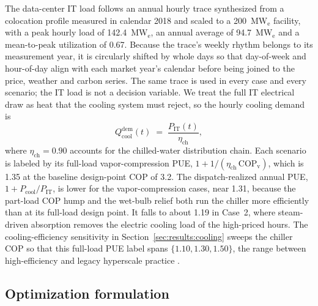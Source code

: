 \documentclass[sn-vancouver,Numbered]{sn-jnl}%
\begin{document}
The data-center IT load follows an annual hourly trace synthesized from a colocation profile measured in calendar 2018 and scaled to a 200~MW$_\mathrm{e}$ facility, with a peak hourly load of 142.4~MW$_\mathrm{e}$, an annual average of 94.7~MW$_\mathrm{e}$ and a mean-to-peak utilization of 0.67. Because the trace's weekly rhythm belongs to its measurement year, it is circularly shifted by whole days so that day-of-week and hour-of-day align with each market year's calendar before being joined to the price, weather and carbon series. The same trace is used in every case and every scenario; the IT load is not a decision variable. We treat the full IT electrical draw as heat that the cooling system must reject, so the hourly cooling demand is
\begin{equation}
\label{eq:cool_demand}
Q_{\mathrm{cool}}^{\mathrm{dem}}(t) \;=\; \frac{P_{\mathrm{IT}}(t)}{\eta_{\mathrm{ch}}},
\end{equation}
where $\eta_{\mathrm{ch}}=0.90$ accounts for the chilled-water distribution chain. Each scenario is labeled by its full-load vapor-compression PUE, $1+1/(\eta_{\mathrm{ch}}\,\mathrm{COP}_{\mathrm{v}})$, which is 1.35 at the baseline design-point COP of 3.2. The dispatch-realized annual PUE, $1+P_{\mathrm{cool}}/P_{\mathrm{IT}}$, is lower for the vapor-compression cases, near 1.31, because the part-load COP hump and the wet-bulb relief both run the chiller more efficiently than at its full-load design point. It falls to about 1.19 in Case~2, where steam-driven absorption removes the electric cooling load of the high-priced hours. The cooling-efficiency sensitivity in Section~\ref{sec:results:cooling} sweeps the chiller COP so that this full-load PUE label spans $\{1.10, 1.30, 1.50\}$, the range between high-efficiency and legacy hyperscale practice \citep{greenGrid2012pue,ashrae2021thermal}.

\subsection{Optimization formulation}
\label{sec:methods:opt}
\end{document}
